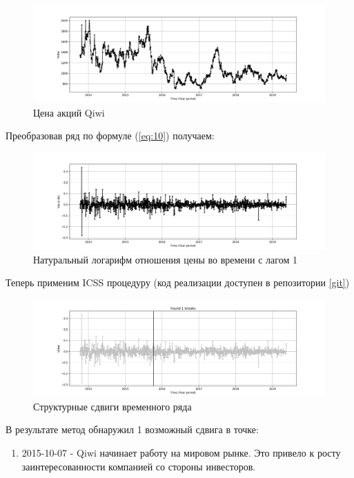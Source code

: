 \documentclass[a4paper,14pt,russian]{extarticle}
\begin{document}
	\begin{figure}[H]
		\includegraphics[width=\linewidth]{source_ts_QIWI.png}
		\caption{\label{fig:0} Цена акций Qiwi}
	\end{figure}
	Преобразовав ряд по формуле (\ref{eq:10}) получаем:
	\begin{figure}[H]
		\includegraphics[width=\linewidth]{source_ln_ts_QIWI.png}
		\caption{\label{fig:1} Натуральный логарифм отношения цены во времени с лагом 1}
	\end{figure}
	Теперь применим ICSS процедуру (код реализации доступен в репозитории \ref{git})
	\begin{figure}[H]
		\includegraphics[width=\linewidth]{ru_stock_simulation_QIWI.png}
		\caption{\label{fig:2} Структурные сдвиги временного ряда}
	\end{figure}
	В результате метод обнаружил 1 возможный сдвига в точке:
	\begin{enumerate}
		\item 2015-10-07 - Qiwi начинает работу на мировом рынке. Это привело к росту заинтересованности компанией со стороны инвесторов. 
	\end{enumerate}
	
\end{document}
